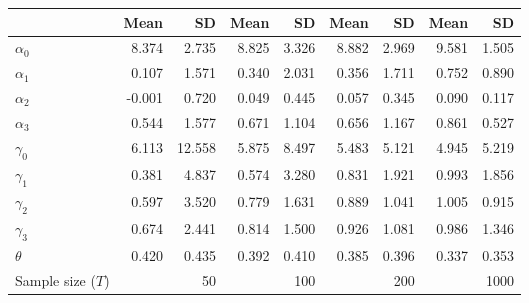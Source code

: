 
\begin{tabular}[t]{lrrrrrrrr}
\toprule
  & Mean & SD & Mean  & SD  & Mean   & SD   & Mean    & SD   \\
\midrule
$\alpha_{0}$ & 8.374 & 2.735 & 8.825 & 3.326 & 8.882 & 2.969 & 9.581 & 1.505\\
$\alpha_{1}$ & 0.107 & 1.571 & 0.340 & 2.031 & 0.356 & 1.711 & 0.752 & 0.890\\
$\alpha_{2}$ & -0.001 & 0.720 & 0.049 & 0.445 & 0.057 & 0.345 & 0.090 & 0.117\\
$\alpha_{3}$ & 0.544 & 1.577 & 0.671 & 1.104 & 0.656 & 1.167 & 0.861 & 0.527\\
$\gamma_{0}$ & 6.113 & 12.558 & 5.875 & 8.497 & 5.483 & 5.121 & 4.945 & 5.219\\
$\gamma_{1}$ & 0.381 & 4.837 & 0.574 & 3.280 & 0.831 & 1.921 & 0.993 & 1.856\\
$\gamma_{2}$ & 0.597 & 3.520 & 0.779 & 1.631 & 0.889 & 1.041 & 1.005 & 0.915\\
$\gamma_{3}$ & 0.674 & 2.441 & 0.814 & 1.500 & 0.926 & 1.081 & 0.986 & 1.346\\
$\theta$ & 0.420 & 0.435 & 0.392 & 0.410 & 0.385 & 0.396 & 0.337 & 0.353\\
Sample size ($T$) &  & 50 &  & 100 &  & 200 &  & 1000\\
\bottomrule
\end{tabular}

